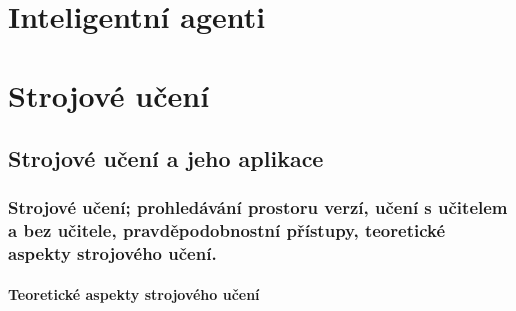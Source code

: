 \documentclass[11pt]{report} %
\numberwithin{equation}{section}
\begin{document}
\part{Inteligentní agenti}



\part{Strojové učení}
\chapter{Strojové učení a jeho aplikace}
\section{Strojové učení; prohledávání prostoru verzí, učení s učitelem a bez učitele, pravděpodobnostní přístupy, teoretické aspekty strojového učení.}
\subsection{Teoretické aspekty strojového učení}
\end{document}
